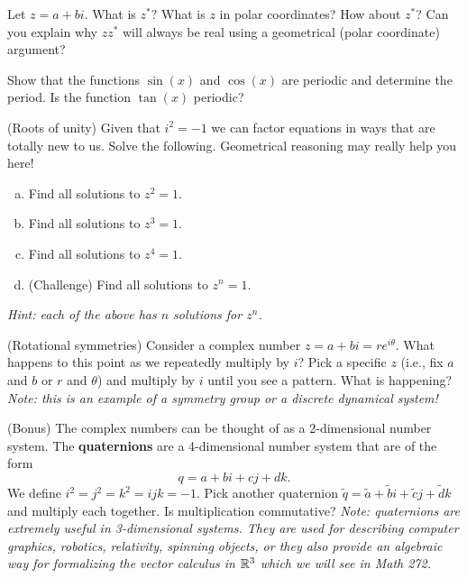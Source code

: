 \begin{problem}
Let $z=a+bi$.  What is $z^*?$  What is $z$ in polar coordinates? How about $z^*$? Can you explain why $zz^*$ will always be real using a geometrical (polar coordinate) argument?
\end{problem}

\begin{problem}
Show that the functions $\sin(x)$ and $\cos(x)$ are periodic and determine the period.  Is the function $\tan(x)$ periodic?
\end{problem}

\begin{problem}
(Roots of unity) Given that $i^2=-1$ we can factor equations in ways that are totally new to us.  Solve the following. Geometrical reasoning may really help you here!
\begin{enumerate}[(a)]
    \item Find all solutions to $z^2=1$.
    \item Find all solutions to $z^3=1$.
    \item Find all solutions to $z^4=1$.
    \item (Challenge) Find all solutions to $z^n=1$.
\end{enumerate}
\emph{Hint: each of the above has $n$ solutions for $z^n$.}
\end{problem}


\begin{problem}
(Rotational symmetries) Consider a complex number $z=a+bi=re^{i\theta}$. What happens to this point as we repeatedly multiply by $i$? Pick a specific $z$ (i.e., fix $a$ and $b$ or $r$ and $\theta$) and multiply by $i$ until you see a pattern.  What is happening? \emph{Note: this is an example of a symmetry group or a discrete dynamical system!}
\end{problem}

\begin{problem}
(Bonus) The complex numbers can be thought of as a 2-dimensional number system. The \textbf{quaternions} are a 4-dimensional number system that are of the form
\[
q = a+bi+cj+dk.
\]
We define $i^2=j^2=k^2=ijk=-1$. Pick another quaternion $\tilde{q}=\tilde{a}+\tilde{b}i+\tilde{c}j+\tilde{d}k$ and multiply each together. Is multiplication commutative? \emph{Note: quaternions are extremely useful in 3-dimensional systems. They are used for describing computer graphics, robotics, relativity, spinning objects, or they also provide an algebraic way for formalizing the vector calculus in $\mathbb{R}^3$ which we will see in Math 272.}
\end{problem}